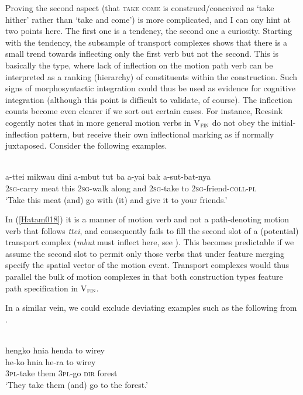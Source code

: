 Proving the second aspect (that \textsc{take} \textsc{come} is construed/conceived as `take hither' rather than `take and come') is more complicated, and I can ony hint at two points here. The first one is a tendency, the second one a curiosity. Starting with the tendency, the subsample of transport complexes shows that there is a small trend towards inflecting only the first verb but not the second. This is basically the  type, where lack of inflection on the motion path verb can be interpreted as a ranking (hierarchy) of constituents within the construction. Such signs of morphosyntactic integration could thus be used as evidence for cognitive integration (although this point is difficult to validate, of course). The inflection counts become even clearer if we sort out certain cases. For instance, Reesink cogently notes that in  more general motion verbs in V$_{\textsc{fin}}$ do not obey the initial-inflection pattern, but receive their own inflectional marking as if normally juxtaposed. Consider the following examples.

\ea \label{Hatam018}
\\
\gll a-ttei mikwau dini a-mbut tut ba a-yai bak a-sut-bat-nya \\
\textsc{2}\textsc{sg}-carry meat this \textsc{2}\textsc{sg}-walk along and \textsc{2}\textsc{sg}-take to \textsc{2}\textsc{sg}-friend-\textsc{coll}-\textsc{pl} \\
\glft `Take this meat (and) go with (it) and give it to your friends.'\\ 
\z

In (\ref{Hatam018}) it is a manner of motion verb and not a path-denoting motion verb that follows \textit{ttei}, and consequently fails to fill the second slot of a (potential) transport complex (\textit{mbut} must inflect here, see \citealt[100]{reesink1999grammar}). This becomes predictable if we assume the second slot to permit only those verbs that under feature merging specify the spatial vector of the motion event. Transport complexes would thus parallel the bulk of motion complexes in that both construction types feature path specification in V$_{\textsc{fin}}$. 

In a similar vein, we could exclude deviating examples such as the following from .

\ea \label{Wooi137}
\\
\glll hengko hnia henda to wirey \\
he-ko hnia he-ra to wirey \\
\textsc{3}\textsc{pl}-take them \textsc{3}\textsc{pl}-go \textsc{dir} forest \\
\glft `They take them (and) go to the forest.'\\ 
\z

